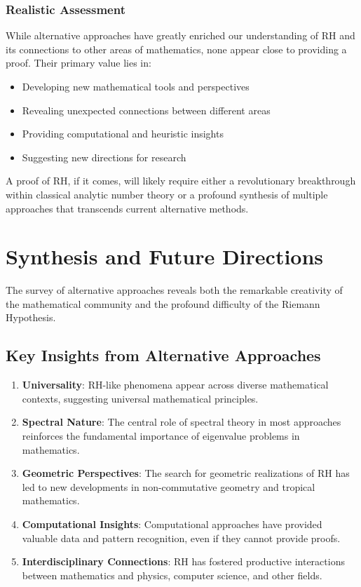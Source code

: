 \subsubsection{Realistic Assessment}

\begin{assessment}
While alternative approaches have greatly enriched our understanding of RH and its connections to other areas of mathematics, none appear close to providing a proof. Their primary value lies in:
\begin{itemize}
\item Developing new mathematical tools and perspectives
\item Revealing unexpected connections between different areas
\item Providing computational and heuristic insights
\item Suggesting new directions for research
\end{itemize}

A proof of RH, if it comes, will likely require either a revolutionary breakthrough within classical analytic number theory or a profound synthesis of multiple approaches that transcends current alternative methods.
\end{assessment}

\section{Synthesis and Future Directions}
\label{sec:synthesis_future}

The survey of alternative approaches reveals both the remarkable creativity of the mathematical community and the profound difficulty of the Riemann Hypothesis.

\subsection{Key Insights from Alternative Approaches}

\begin{enumerate}
\item \textbf{Universality}: RH-like phenomena appear across diverse mathematical contexts, suggesting universal mathematical principles.

\item \textbf{Spectral Nature}: The central role of spectral theory in most approaches reinforces the fundamental importance of eigenvalue problems in mathematics.

\item \textbf{Geometric Perspectives}: The search for geometric realizations of RH has led to new developments in non-commutative geometry and tropical mathematics.

\item \textbf{Computational Insights}: Computational approaches have provided valuable data and pattern recognition, even if they cannot provide proofs.

\item \textbf{Interdisciplinary Connections}: RH has fostered productive interactions between mathematics and physics, computer science, and other fields.
\end{enumerate}

